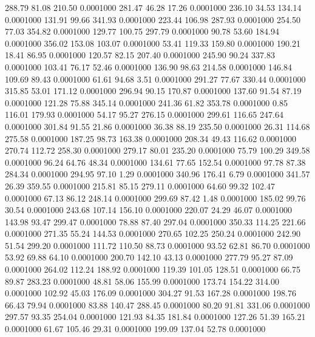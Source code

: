  288.79   81.08  210.50   0.0001000
 281.47   46.28   17.26   0.0001000
 236.10   34.53  134.14   0.0001000
 131.91   99.66  341.93   0.0001000
 223.44  106.98  287.93   0.0001000
 254.50   77.03  354.82   0.0001000
 129.77  100.75  297.79   0.0001000
  90.78   53.60  184.94   0.0001000
 356.02  153.08  103.07   0.0001000
  53.41  119.33  159.80   0.0001000
 190.21   18.41   86.95   0.0001000
 120.57   82.15  207.40   0.0001000
 245.90   90.24  337.83   0.0001000
 103.41   76.17   52.46   0.0001000
 136.90   98.63  214.58   0.0001000
 146.84  109.69   89.43   0.0001000
  61.61   94.68    3.51   0.0001000
 291.27   77.67  330.44   0.0001000
 315.85   53.01  171.12   0.0001000
 296.94   90.15  170.87   0.0001000
 137.60   91.54   87.19   0.0001000
 121.28   75.88  345.14   0.0001000
 241.36   61.82  353.78   0.0001000
   0.85  116.01  179.93   0.0001000
  54.17   95.27  276.15   0.0001000
 299.61  116.65  247.64   0.0001000
 301.84   91.55   21.86   0.0001000
  36.38   88.19  235.50   0.0001000
  26.31  114.68  275.58   0.0001000
 187.25   98.73  163.38   0.0001000
 208.34   49.43  116.62   0.0001000
 270.74  112.72  258.30   0.0001000
 279.17   80.01  235.20   0.0001000
  75.79  100.29  349.58   0.0001000
  96.24   64.76   48.34   0.0001000
 134.61   77.65  152.54   0.0001000
  97.78   87.38  284.34   0.0001000
 294.95   97.10    1.29   0.0001000
 340.96  176.41    6.79   0.0001000
 341.57   26.39  359.55   0.0001000
 215.81   85.15  279.11   0.0001000
  64.60   99.32  102.47   0.0001000
  67.13   86.12  248.14   0.0001000
 299.69   87.42    1.48   0.0001000
 185.02   99.76   30.54   0.0001000
 243.68  107.14  156.10   0.0001000
 220.07   24.29   46.07   0.0001000
 143.98   93.47  299.47   0.0001000
  78.88   87.40  297.04   0.0001000
 350.33  114.25  221.66   0.0001000
 271.35   55.24  144.53   0.0001000
 270.65  102.25  250.24   0.0001000
 242.90   51.54  299.20   0.0001000
 111.72  110.50   88.73   0.0001000
  93.52   62.81   86.70   0.0001000
  53.92   69.88   64.10   0.0001000
 200.70  142.10   43.13   0.0001000
 277.79   95.27   87.09   0.0001000
 264.02  112.24  188.92   0.0001000
 119.39  101.05  128.51   0.0001000
  66.75   89.87  283.23   0.0001000
  48.81   58.06  155.99   0.0001000
 173.74  154.22  314.00   0.0001000
 102.92   45.03  176.09   0.0001000
 304.27   91.53  167.28   0.0001000
 198.76   66.43   79.94   0.0001000
  83.88  140.47  288.45   0.0001000
  80.20   91.81  331.06   0.0001000
 297.57   93.35  254.04   0.0001000
 121.93   84.35  181.84   0.0001000
 127.26   51.39  165.21   0.0001000
  61.67  105.46   29.31   0.0001000
 199.09  137.04   52.78   0.0001000
